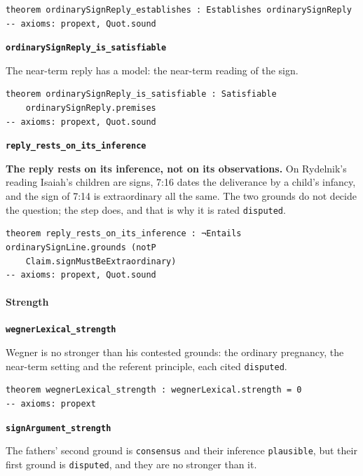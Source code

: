 \documentclass[11pt]{article}
\begin{document}
{\small\begin{verbatim}
theorem ordinarySignReply_establishes : Establishes ordinarySignReply
-- axioms: propext, Quot.sound
\end{verbatim}}
\par\medskip\noindent\textbf{\texttt{ordinary\allowbreak{}Sign\allowbreak{}Reply\_\allowbreak{}is\_\allowbreak{}satisfiable}}\par\nobreak\noindent
The near-term reply has a model: the near-term reading of the sign.

{\small\begin{verbatim}
theorem ordinarySignReply_is_satisfiable : Satisfiable
    ordinarySignReply.premises
-- axioms: propext, Quot.sound
\end{verbatim}}
\par\medskip\noindent\textbf{\texttt{reply\_\allowbreak{}rests\_\allowbreak{}on\_\allowbreak{}its\_\allowbreak{}inference}}\par\nobreak\noindent
\textbf{The reply rests on its inference, not on its observations.} On Rydelnik’s reading Isaiah’s children are signs, 7:16 dates the deliverance by a child’s infancy, and the sign of 7:14 is extraordinary all the same. The two grounds do not decide the question; the step does, and that is why it is rated \texttt{disputed}.

{\small\begin{verbatim}
theorem reply_rests_on_its_inference : ¬Entails ordinarySignLine.grounds (notP
    Claim.signMustBeExtraordinary)
-- axioms: propext, Quot.sound
\end{verbatim}}
\paragraph*{Strength}
\leavevmode\par\nobreak
\par\medskip\noindent\textbf{\texttt{wegner\allowbreak{}Lexical\_\allowbreak{}strength}}\par\nobreak\noindent
Wegner is no stronger than his contested grounds: the ordinary pregnancy, the near-term setting and the referent principle, each cited \texttt{disputed}.

{\small\begin{verbatim}
theorem wegnerLexical_strength : wegnerLexical.strength = 0
-- axioms: propext
\end{verbatim}}
\par\medskip\noindent\textbf{\texttt{sign\allowbreak{}Argument\_\allowbreak{}strength}}\par\nobreak\noindent
The fathers’ second ground is \texttt{consensus} and their inference \texttt{plausible}, but their first ground is \texttt{disputed}, and they are no stronger than it.
\end{document}
